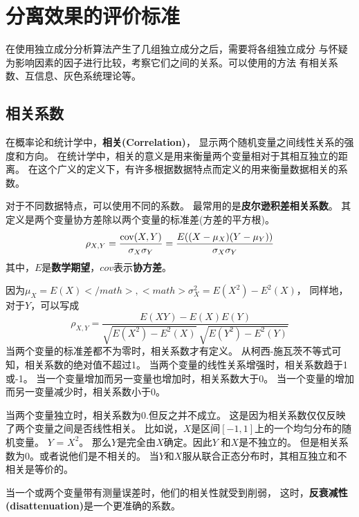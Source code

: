 ﻿%

\chapter{分离效果的评价标准}

\label{chap03}

在使用独立成分分析算法产生了几组独立成分之后，需要将各组独立成分
与怀疑为影响因素的因子进行比较，考察它们之间的关系。可以使用的方法
有相关系数、互信息、灰色系统理论等。
 
\section{相关系数}
在概率论和统计学中，\textbf{相关(Correlation)}，
显示两个随机变量之间线性关系的强度和方向。
在统计学中，相关的意义是用来衡量两个变量相对于其相互独立的距离。
在这个广义的定义下，有许多根据数据特点而定义的用来衡量数据相关的系数。

对于不同数据特点，可以使用不同的系数。
最常用的是\textbf{皮尔逊积差相关系数}。
其定义是两个变量协方差除以两个变量的标准差(方差的平方根)。
\begin{equation}
\rho_{X,Y} = {\mathrm{cov}(X,Y) \over \sigma_X \sigma_Y} 
           = {E((X-\mu_X)(Y-\mu_Y)) \over \sigma_X\sigma_Y}
\end{equation}
其中，$E$是\textbf{数学期望}，$cov$表示\textbf{协方差}。

因为$\mu_X = E(X)</math>, <math>\sigma_X^2 = E(X^2) - E^2(X)$，
同样地，对于$Y$，可以写成
\begin{equation}
\rho_{X,Y} = 
       \frac{E(XY)-E(X)E(Y)}
            {\sqrt{E(X^2)-E^2(X)}~\sqrt{E(Y^2)-E^2(Y)}}
\end{equation}
当两个变量的标准差都不为零时，相关系数才有定义。
从柯西-施瓦茨不等式可知，相关系数的绝对值不超过1。
当两个变量的线性关系增强时，相关系数趋于1或-1。
当一个变量增加而另一变量也增加时，相关系数大于0。
当一个变量的增加而另一变量减少时，相关系数小于0。

当两个变量独立时，相关系数为0.但反之并不成立。 
这是因为相关系数仅仅反映了两个变量之间是否线性相关。
比如说，$X$是区间$[-1, 1]$上的一个均匀分布的随机变量。
$Y$ = $X^2$。 那么$Y$是完全由$X$确定。因此$Y$ 和$X$是不独立的。
但是相关系数为0。或者说他们是不相关的。
当$Y$和$X$服从联合正态分布时，其相互独立和不相关是等价的。

当一个或两个变量带有测量误差时，他们的相关性就受到削弱，
这时，\textbf{反衰减性(disattenuation)}是一个更准确的系数。


